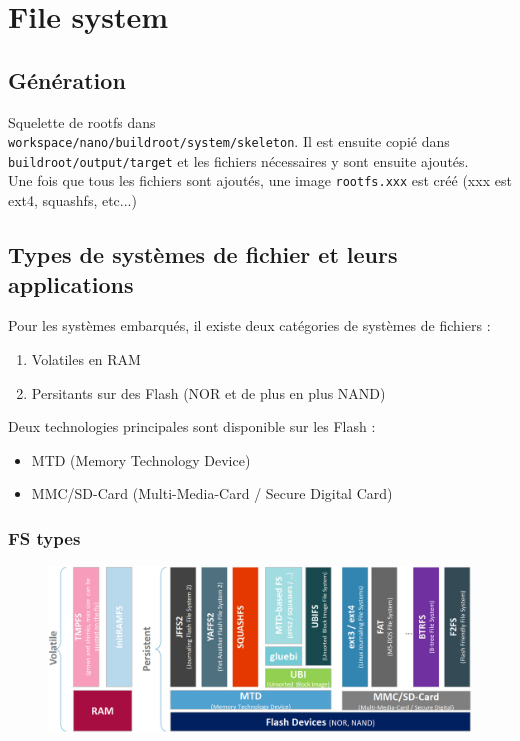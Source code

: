 \documentclass[resume]{subfiles}
\begin{document}
\section{File system}
\subsection{Génération}
Squelette de rootfs dans \\ \verb!workspace/nano/buildroot/system/skeleton!. Il est ensuite copié dans \verb!buildroot/output/target! et les fichiers nécessaires y sont ensuite ajoutés.\\
Une fois que tous les fichiers sont ajoutés, une image \verb!rootfs.xxx! est créé (xxx est ext4, squashfs, etc...)

\subsection{Types de systèmes de fichier et leurs applications}

Pour les systèmes embarqués, il existe deux catégories de systèmes de fichiers :
\begin{enumerate}
    \item Volatiles en RAM
    \item Persitants sur des Flash (NOR et de plus en plus NAND)
\end{enumerate}

Deux technologies principales sont disponible sur les Flash :  
\begin{itemize}
    \item MTD (Memory Technology Device)
    \item MMC/SD-Card (Multi-Media-Card / Secure Digital Card)
\end{itemize}

\subsubsection{FS types}
\begin{figure}[H]
    \centering
    \includegraphics[width=1\columnwidth]{Figures/fileSystem/fileSystemType.PNG}
    \label{fig:fileSystemType}
\end{figure}
\end{document}

